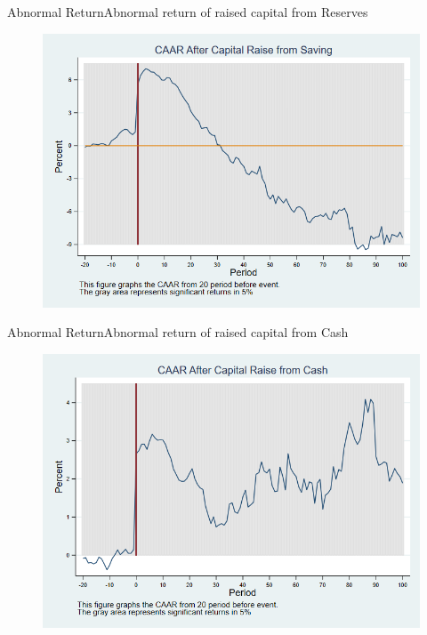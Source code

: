\documentclass{beamer}
\begin{document}
	
	
	\begin{frame}{Abnormal Return}{Abnormal return of raised capital from Reserves}
		\label{abreturnsaving}
		\begin{figure}
			\centering
			\includegraphics[width=0.65\linewidth]{Output/CARSaving.png}
			\label{fig:abreturnsaving}
		\end{figure}
		

	\end{frame}
	
	
	
	
	\begin{frame}{Abnormal Return}{Abnormal return of raised capital from Cash}
		\label{abreturncash}
		\begin{figure}
			\centering
			\includegraphics[width=0.65\linewidth]{Output/CARCash.png}
			\label{fig:abreturncash}
		\end{figure}

	\end{frame}
	
	
	
	
	
\end{document}
